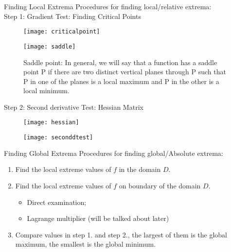 \documentclass[10pt]{beamer}
\begin{document}
\begin{frame}[allowframebreaks]{Finding Local Extrema}
Procedures for finding {\color{red}local/relative} extrema:\\
Step 1: 
{\color{blue}Gradient Test: Finding \color{red}Critical Points}
\begin{figure}[H]
	\centering
	\texttt{[image: criticalpoint]}
\end{figure}

\begin{figure}[H]
	\centering
	\texttt{[image: saddle]}
	\caption{{\color{red}Saddle point:} In general, we will say that a function has a saddle point P if there are two
		distinct vertical planes through P such that P in one of the planes is a
		local maximum and P in the other is a local minimum.}
	\end{figure}
	
Step 2: 
{\color{blue}Second derivative Test: {\color{red}Hessian Matrix}}
\begin{figure}[H]
	\centering
	\texttt{[image: hessian]}
\end{figure}
\begin{figure}[H]
	\centering
	\texttt{[image: seconddtest]}
\end{figure}

	
\end{frame}



\begin{frame}[allowframebreaks]{Finding Global Extrema}
Procedures for finding {\color{red}global/Absolute} extrema:
\begin{enumerate}
	\item Find the local extreme values of $f$ in the domain $D$.
	\item Find the local extreme values of $f$ on boundary of the domain $D$.
	\begin{itemize}
		\item Direct examination;
		\item Lagrange multiplier (will be talked about later)
	\end{itemize}
	\item Compare values in step 1. and step 2., the largest of them is the global
	maximum, the smallest is the global minimum.
\end{enumerate}

	
\end{frame}
\end{document}
